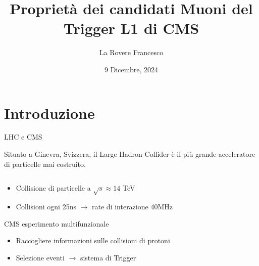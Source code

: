\documentclass{beamer}
\title{Proprietà dei candidati Muoni del Trigger L1 di CMS}
\author[La Rovere Francesco]{La Rovere Francesco}
\date{9 Dicembre, 2024}
\begin{document}
\footnotesize

\frame{\titlepage}

\section{Introduzione}

\begin{frame}{LHC e CMS}

Situato a Ginevra, Svizzera, il Large Hadron Collider è il più grande acceleratore di particelle mai costruito. 


\begin{columns}
    \begin{column}{0.55\textwidth}
        \begin{itemize}            
            \item Collisione di particelle a $\sqrt{s} \approx 14$ TeV
            \item Collisioni ogni 25ns $\rightarrow$ rate di interazione 40MHz
        \end{itemize}

        CMS esperimento multifunzionale
        \begin{itemize}
            \item Raccogliere informazioni sulle collisioni di protoni
            \item Selezione eventi $\rightarrow$ sistema di Trigger

        \end{itemize}
    \end{column}
    \begin{column}{0.4\textwidth}  
    \end{column}
\end{columns}

\end{frame}
\end{document}
